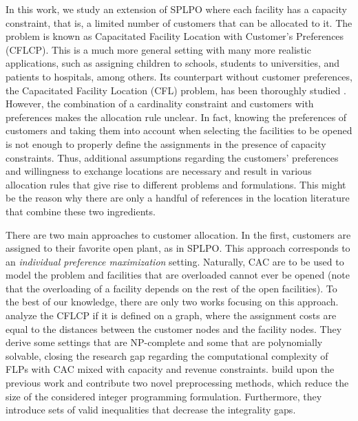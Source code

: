 \documentclass[preprint,11pt,authoryear]{elsarticle}
\begin{document}
In this work, we study an extension of SPLPO where each facility has a capacity constraint, that is, a limited number of customers that can be allocated to it. The problem is known as Capacitated Facility Location with Customer's Preferences (CFLCP). This is a much more general setting with many more realistic applications, such as assigning children to schools, students to universities, and patients to hospitals, among others. Its counterpart without customer preferences, the Capacitated Facility Location (CFL) problem, has been thoroughly studied  \citep[without being exhaustive, see e.g.][]{avella2009, gortz2012, fernandez2015, fischetti2016}. However, the combination of a cardinality constraint and customers with preferences makes the allocation rule unclear. In fact, knowing the preferences of customers and taking them into account when selecting the facilities to be opened is not enough to properly define the assignments in the presence of capacity constraints. Thus, additional assumptions regarding the customers' preferences and willingness to exchange locations are necessary and result in various allocation rules that give rise to different problems and formulations. This might be the reason why there are only a handful of references in the location literature that combine these two ingredients. 

There are two main approaches to customer allocation. In the first, customers are assigned to their favorite open plant, as in  SPLPO. This approach corresponds to an \textit{individual preference maximization} setting. Naturally, CAC are to be used to model the problem and facilities that are overloaded cannot ever be opened (note that the overloading of a facility depends on the rest of the open facilities). To the best of our knowledge, there are only two works focusing on this approach. \cite{busing2022} analyze the CFLCP if it is defined on a graph, where the assignment costs are equal to the distances between the customer nodes and the facility nodes. They derive some settings that are NP-complete and some that are
polynomially solvable, closing the research gap regarding the computational complexity of FLPs with CAC mixed with capacity and revenue constraints. \cite{busing2025} build upon the previous work and contribute two novel preprocessing
methods, which reduce the size of the considered integer programming formulation. Furthermore, they introduce sets of valid inequalities that decrease the integrality gaps.
\end{document}
